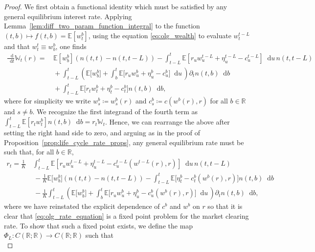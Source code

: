 \documentclass[10pt,a4paper]{amsart}
\theoremstyle{plain}
\theoremstyle{plain}
\theoremstyle{definition}
\theoremstyle{remark}
\newcommand{\dd}{\mathop{}\!\mathrm{d}}
\newcommand{\mbE}{\mathbb{E}}
\newcommand{\mbR}{\mathbb{R}}
\newcommand{\mbW}{\mathbb{W}}
\begin{document}
\begin{proof}
%
We first obtain a functional identity which must be satisfied by any general equilibrium interest rate. Applying Lemma~\ref{lem:diff_two_param_function_integral} to the function $(t,b)\mapsto f(t,b) = \mbE[w^b_t]$, using the equation \eqref{eq:olg_wealth} to evaluate $w^{t-L}_t$ and that $w^t_t \equiv w^b_b$, one finds
   \begin{align*}
       \frac{\dd}{\dd t} \mbW_t(r) =&\,  \mbE[w^{b}_b]\left(n(t,t)-n(t,t-L)\right)- \int_{t-L}^t \mbE\left[r_u w^{t-L}_u + \eta^{t-L}_u - c^{t-L}_u \right] \dd u \,n(t,t-L) \\
       &\, + \int_{t-L}^t \left(\mbE\big[w^b_b\big]+\int_b^t \mbE\big[r_u w^b_u + \eta^b_u - c^b_u \big] \dd u \,\right)  \partial_t n(t,b) \dd b\\
       &\, + \int_{t-L}^t \mbE\big[r_t w^b_t + \eta^b_t - c^b_t \big] n(t,b)\dd b,
   \end{align*}
   where for simplicity we write $w^b_s \coloneqq  w^b_s(r)$ and $c^b_s \coloneqq c(w^b(r),r)$ for all $b\in \mbR$ and $s\neq b$. We recognize the first integrand of the fourth term as $\int_{t-L}^t \mbE[r_t w^b_t] n(t,b) \dd b = r_t \mbW_t$. Hence, we can rearrange the above after setting the right hand side to zero, and arguing as in the proof of Proposition~\ref{prop:life_cycle_rate_props}, any general equilibrium rate must be such that, for all $b \in \mbR$,
   \begin{equation}\label{eq:olg_rate_equation}
       \begin{aligned}
       r_t = \frac{1}{K}\,&\int_{t-L}^t \mbE\left[r_u w^{t-L}_u  + \eta^{t-L}_u - c^{t-L}_u(w^{t-L}(r),r) \right] \dd u \,n(t,t-L)  \\
      &\, - \frac{1}{K}\mbE\big[w^{b}_{b}\big]\left(n(t,t)-n(t,t-L) \right)-\int_{t-L}^t \mbE\big[\eta^b_t - c^b_t(w^{b}(r),r) \big]  n(t,b) \dd b\\
      &\,-  \frac{1}{K} \int_{t-L}^t \left(\mbE\big[w^b_b\big] +\int_b^t \mbE\big[r_u w^b_u + \eta^b_u - c^b_u(w^b(r),r) \big] \dd u \,\right)   \partial_t n(t,b) \dd b,
            \end{aligned}
   \end{equation}
   where we have reinstated the explicit dependence of $c^b$ and $w^b$ on $r$ so that it is clear that \eqref{eq:olg_rate_equation} is a fixed point problem for the market clearing rate. To show that such a fixed point exists, we define the map $\Phi_L :C(\mbR;\mbR) \to C(\mbR;\mbR)$ such that 
   \begin{equation}\label{eq:olg_phi_def}

\end{equation}
\end{proof}
\end{document}
